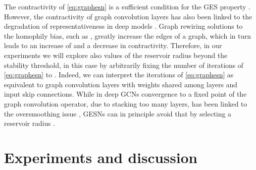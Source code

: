 \documentclass{esannV2p}
\begin{document}
The contractivity of \eqref{eq:graphesn} is a sufficient condition for the GES property \cite{Tortorella2022}.
However, the contractivity of graph convolution layers has also been linked to the degradation of representativeness in deep models \cite{Topping2022}.
Graph rewiring solutions to the homophily bias, such as \cite{Gasteiger2019}, greatly increase the edges of a graph, which in turn leads to an increase of  and a decrease in contractivity.
Therefore, in our experiments we will explore also values of the reservoir radius beyond the stability threshold, in this case by arbitrarily fixing the number of iterations of \eqref{eq:graphesn} to .
Indeed, we can interpret the  iterations of \eqref{eq:graphesn} as equivalent to  graph convolution layers with weights shared among layers and input skip connections.
While in deep GCNs convergence to a fixed point of the graph convolution operator, due to stacking too many layers, has been linked to the oversmoothing issue \cite{Li2018}, GESNs can in principle avoid that by selecting a reservoir radius .

\section{Experiments and discussion}\label{sec:experiments}
\end{document}
